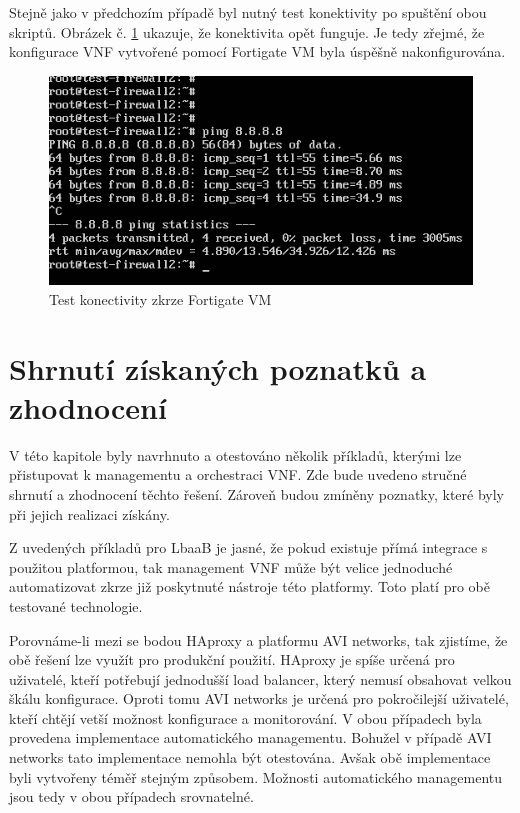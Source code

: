 Stejně jako v předchozím případě byl nutný test konektivity po spuštění obou skriptů. Obrázek č. \ref{fig:test_fortios} ukazuje, že konektivita opět funguje. Je tedy zřejmé, že konfigurace VNF vytvořené pomocí Fortigate VM byla úspěšně nakonfigurována.

\begin{figure}[h]
\begin{centering}
\includegraphics[scale=0.5]{images/test_fortios}
\par\end{centering}
\caption{Test konectivity zkrze Fortigate VM\label{fig:test_fortios}}
\end{figure}

\section{Shrnutí získaných poznatků a zhodnocení}

V této kapitole byly navrhnuto a otestováno několik příkladů, kterými lze přistupovat k managementu a orchestraci VNF. Zde bude uvedeno stručné shrnutí a zhodnocení těchto řešení. Zároveň budou zmíněny poznatky, které byly při jejich realizaci získány.

Z uvedených příkladů pro LbaaB je jasné, že pokud existuje přímá integrace s použitou platformou, tak management VNF může být velice jednoduché automatizovat zkrze již poskytnuté nástroje této platformy. Toto platí pro obě testované technologie.

Porovnáme-li mezi se bodou HAproxy a platformu AVI networks, tak zjistíme, že obě řešení lze využít pro produkční použití. HAproxy je spíše určená pro uživatelé, kteří potřebují jednodušší load balancer, který nemusí obsahovat velkou škálu konfigurace. Oproti tomu AVI networks je určená pro pokročilejší uživatelé, kteří chtějí vetší možnost konfigurace a monitorování. V obou případech byla provedena implementace automatického managementu. Bohužel v případě AVI networks tato implementace nemohla být otestována. Avšak obě implementace byli vytvořeny téměř stejným způsobem. Možnosti automatického managementu jsou tedy v obou případech srovnatelné.

